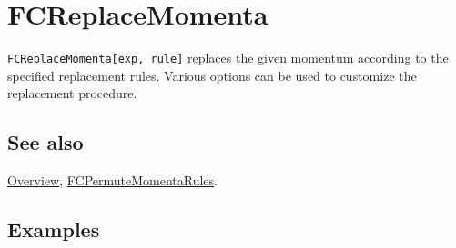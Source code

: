 \documentclass[../FeynCalcManual.tex]{subfiles}
\begin{document}
\hypertarget{fcreplacemomenta}{
\section{FCReplaceMomenta}\label{fcreplacemomenta}}

\texttt{FCReplaceMomenta[\allowbreak{}exp,\ \allowbreak{}rule]} replaces
the given momentum according to the specified replacement rules. Various
options can be used to customize the replacement procedure.

\subsection{See also}

\hyperlink{toc}{Overview},
\hyperlink{fcpermutemomentarules}{FCPermuteMomentaRules}.

\subsection{Examples}
\end{document}
